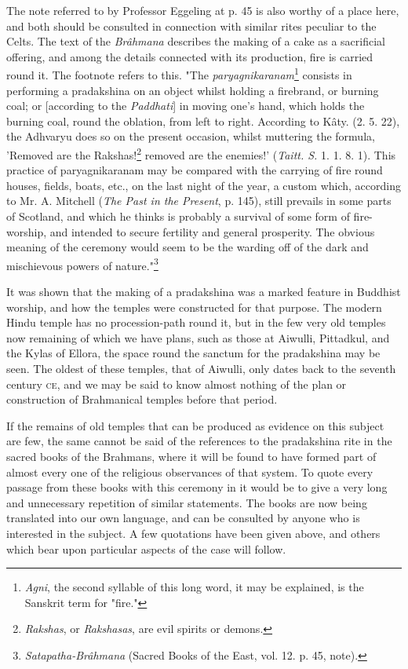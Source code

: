 \documentclass[a4paper, 11pt, oneside, polutonikogreek, english]{article}
\begin{document}
The note referred to by Professor Eggeling at p. 45 is also worthy of a place here, and both should be consulted in connection with similar rites peculiar to the Celts. The text of the \emph{Brâhmana} describes the making of a cake as a sacrificial offering, and among the details connected with its production, fire is carried round it. The footnote refers to this. "The \emph{paryagnikaranam}\footnote{\emph{Agni}, the second syllable of this long word, it may be explained, is the Sanskrit term for "fire."} consists in performing a pradakshina on an object whilst holding a firebrand, or burning coal; or [according to the \emph{Paddhati}] in moving one's hand, which holds the burning coal, round the oblation, from left to right. According to Kâty. (2. 5. 22), the Adhvaryu does so on the present occasion, whilst muttering the formula, 'Removed are the Rakshas!\footnote{\emph{Rakshas}, or \emph{Rakshasas}, are evil spirits or demons.} removed are the enemies!' (\emph{Taitt. S.} 1. 1. 8. 1). This practice of paryagnikaranam may be compared with the carrying of fire round houses, fields, boats, etc., on the last night of the year, a custom which, according to Mr. A. Mitchell (\emph{The Past in the Present}, p. 145), still prevails in some parts of Scotland, and which he thinks is probably a survival of some form of fire-worship, and intended to secure fertility and general prosperity. The obvious meaning of the ceremony would seem to be the warding off of the dark and mischievous powers of nature."\footnote{\emph{Satapatha-Brâhmana} (Sacred Books of the East, vol. 12. p. 45, note).}

It was shown that the making of a pradakshina was a marked feature in Buddhist worship, and how the temples were constructed for that purpose. The modern Hindu temple has no procession-path round it, but in the few very old temples now remaining of which we have plans, such as those at Aiwulli, Pittadkul, and the Kylas of Ellora, the space round the sanctum for the pradakshina may be seen. The oldest of these temples, that of Aiwulli, only dates back to the seventh century \textsc{ce}, and we may be said to know almost nothing of the plan or construction of Brahmanical temples before that period.

If the remains of old temples that can be produced as evidence on this subject are few, the same cannot be said of the references to the pradakshina rite in the sacred books of the Brahmans, where it will be found to have formed part of almost every one of the religious observances of that system. To quote every passage from these books with this ceremony in it would be to give a very long and unnecessary repetition of similar statements. The books are now being translated into our own language, and can be consulted by anyone who is interested in the subject. A few quotations have been given above, and others which bear upon particular aspects of the case will follow.
\end{document}
